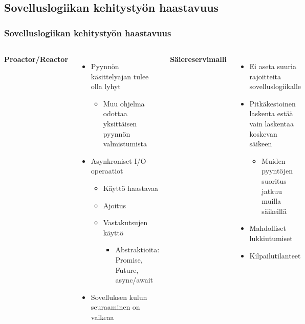 \documentclass{beamer}
\begin{document}
\subsection{Sovelluslogiikan kehitystyön haastavuus}
\begin{frame}
  \frametitle{Sovelluslogiikan kehitystyön haastavuus}
  \begin{columns}
    \textbf{Proactor/Reactor}
    \begin{itemize}
      \item Pyynnön käsittelyajan tulee olla lyhyt
        \begin{itemize}
          \item Muu ohjelma odottaa yksittäisen pyynnön valmistumista
        \end{itemize}
      \item Asynkroniset I/O-operaatiot
        \begin{itemize}
          \item Käyttö haastavaa
          \item Ajoitus
          \item Vastakutsujen käyttö
            \begin{itemize}
              \item Abstraktioita: Promise, Future, async/await
            \end{itemize}
        \end{itemize}
      \item Sovelluksen kulun seuraaminen on vaikeaa
    \end{itemize}
    \textbf{Säiereservimalli}
    \begin{itemize}
      \item Ei aseta suuria rajoitteita sovelluslogiikalle
      \item Pitkäkestoinen laskenta estää vain laskentaa koskevan säikeen
        \begin{itemize}
          \item Muiden pyyntöjen suoritus jatkuu muilla säikeillä
        \end{itemize}
      \item Mahdolliset lukkiutumiset
      \item Kilpailutilanteet
    \end{itemize}
  \end{columns}
\end{frame}
\end{document}
